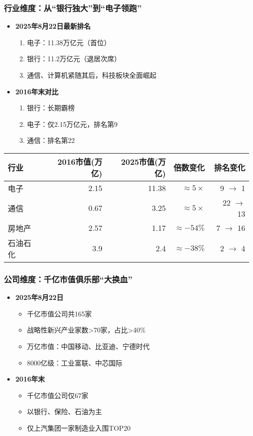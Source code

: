 \subsubsection{行业维度：从“银行独大”到“电子领跑”}
\begin{itemize}
  \item \textbf{2025年8月22日最新排名}
  \begin{enumerate}[label=\arabic*.]
    \item 电子：11.38万亿元（首位）
    \item 银行：11.2万亿元（退居次席）
    \item 通信、计算机紧随其后，科技板块全面崛起
  \end{enumerate}

  \item \textbf{2016年末对比}
  \begin{enumerate}[label=\arabic*.]
    \item 银行：长期霸榜
    \item 电子：仅2.15万亿元，排名第9
    \item 通信：排名第22
  \end{enumerate}
\end{itemize}

\begin{longtable}{@{}lrrrr@{}}
\toprule
行业 & 2016市值(万亿) & 2025市值(万亿) & 倍数变化 & 排名变化 \\
\midrule
电子 & 2.15 & 11.38 & $\approx 5\times$ & 9 $\rightarrow$ 1 \\
通信 & 0.67 & 3.25 & $\approx 5\times$ & 22 $\rightarrow$ 13 \\
房地产 & 2.57 & 1.17 & $\approx -54\%$ & 7 $\rightarrow$ 16 \\
石油石化 & 3.9 & 2.4 & $\approx -38\%$ & 2 $\rightarrow$ 4 \\
\bottomrule
\end{longtable}

\subsubsection{公司维度：千亿市值俱乐部“大换血”}
\begin{itemize}
  \item \textbf{2025年8月22日}
  \begin{itemize}
    \item 千亿市值公司共165家
    \item 战略性新兴产业家数>70家，占比>40\%
    \item 万亿市值：中国移动、比亚迪、宁德时代
    \item 8000亿级：工业富联、中芯国际
  \end{itemize}

  \item \textbf{2016年末}
  \begin{itemize}
    \item 千亿市值公司仅67家
    \item 以银行、保险、石油为主
    \item 仅上汽集团一家制造业入围TOP20
  \end{itemize}
\end{itemize}

